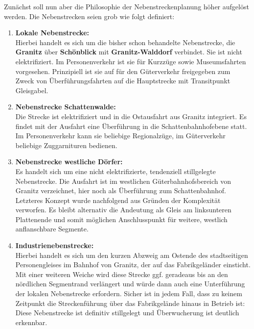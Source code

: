 Zun\"achst soll nun aber die Philosophie der Nebenstreckenplanung h\"oher aufgel\"ost werden.
Die Nebenstrecken seien grob wie folgt definiert:
\begin{enumerate}
	\item \textbf{Lokale Nebenstrecke:}\\
	Hierbei handelt es sich um die bisher schon behandelte Nebenstrecke, die \textbf{Granitz} \"uber \textbf{Sch\"onblick} mit \textbf{Granitz-Walddorf} verbindet.
	Sie ist nicht elektrifiziert.
	Im Personenverkehr ist sie f\"ur Kurzz\"uge sowie Museumsfahrten vorgesehen.
	Prinzipiell ist sie auf f\"ur den G\"uterverkehr freigegeben zum Zweck von \"Uberf\"uhrungsfahrten auf die Hauptstrecke mit Transitpunkt Gleisgabel.
	\item \textbf{Nebenstrecke Schattenwalde:}\\
	Die Strecke ist elektrifiziert und in die Ostausfahrt aus Granitz integriert.
	Es findet mit der Ausfahrt eine \"Uberf\"uhrung in die Schattenbahnhofebene statt.
	Im Personenverkehr kann sie beliebige Regionalz\"uge, im G\"uterverkehr beliebige Zuggarnituren bedienen.
	\item \textbf{Nebenstrecke westliche D\"orfer:}\\
	Es handelt sich um eine nicht elektrifizierte, tendenziell stillgelegte Nebenstrecke.
	Die Ausfahrt ist im westlichen G\"uterbahnhofsbereich von Granitz verzeichnet, hier noch als \"Uberf\"uhrung zum Schattenbahnhof.
	Letzteres Konzept wurde nachfolgend aus Gr\"unden der Komplexit\"at verworfen.
	Es bleibt alternativ die Andeutung als Gleis am linksunteren Plattenende und somit m\"oglichen Anschlusspunkt f\"ur weitere, westlich anflanschbare Segmente.
	\item \textbf{Industrienebenstrecke:}\\
	Hierbei handelt es sich um den kurzen Abzweig am Ostende des stadtseitigen Personengleises im Bahnhof von Granitz, der auf das Fabrikgel\"ander einsticht.
	Mit einer weiteren Weiche wird diese Strecke ggf. geradeaus bis an den n\"ordlichen Segmentrand verl\"angert und w\"urde dann auch eine Unterf\"uhrung der lokalen Nebenstrecke erfordern.
	Sicher ist in jedem Fall, dass zu keinem Zeitpunkt die Streckenf\"uhrung \"uber das Fabrikgel\"ande hinaus in Betrieb ist:
	Diese Nebenstrecke ist definitiv stillgelegt und \"Uberwucherung ist deutlich erkennbar.
\end{enumerate}

